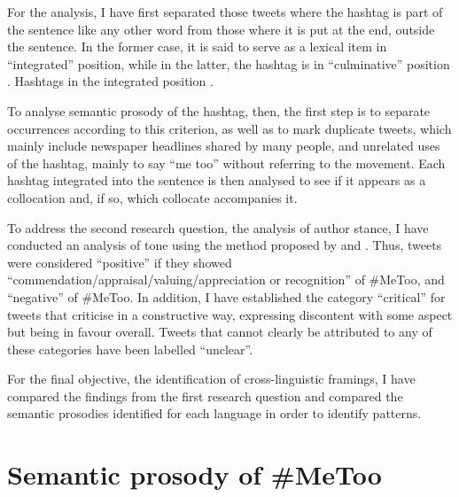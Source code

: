 \documentclass[output=paper,english,spanish,german,english]{langsci/langscibook}
\begin{document}
For the analysis, I have first separated those tweets where the hashtag is part of the sentence like any other word from those where it is put at the end, outside the sentence. In the former case, it is said to serve as a lexical item in \enquote{integrated} position, while in the latter, the hashtag is in \enquote{culminative} position \parencites[31--32]{zappavigna18}[see also][14]{scott15}. Hashtags in the integrated position .

To analyse semantic prosody of the \mt hashtag, then, the first step is to separate occurrences according to this criterion, as well as to mark duplicate tweets, which mainly include newspaper headlines shared by many people, and unrelated uses of the hashtag, mainly to say \enquote{me too} without referring to the movement. Each hashtag integrated into the sentence is then analysed to see if it appears as a collocation and, if so, which collocate accompanies it.

To address the second research question, the analysis of author stance, I have conducted an analysis of tone using the method proposed by \textcite{orgben15} and \textcite{druzob16}. Thus, tweets were considered \enquote{positive} if they showed \enquote{commendation\slash appraisal\slash valuing\slash appreciation or recognition} of \#MeToo, and \enquote{negative}  of \#MeToo. In addition, I have established the category \enquote{critical} for tweets that criticise \mt in a constructive way, expressing discontent with some aspect but being in favour overall. Tweets that cannot clearly be attributed to any of these categories have been labelled \enquote{unclear}.

For the final objective, the identification of cross-linguistic framings, I have compared the findings from the first research question and compared the semantic prosodies identified for each language in order to identify patterns.

\section{Semantic prosody of \#MeToo}\label{pros}
\end{document}
